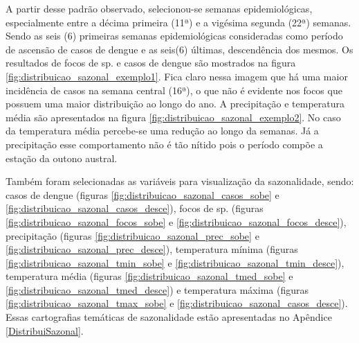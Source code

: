 \indent A partir desse padrão observado, selecionou-se semanas epidemiológicas, especialmente entre a décima primeira (11ª) e a vigésima segunda (22ª) semanas. Sendo as seis (6) primeiras semanas epidemiológicas consideradas como período de ascensão de casos de dengue e as seis(6) últimas, descendência dos mesmos. Os resultados de focos de  sp. e casos de dengue são mostrados na figura \ref{fig:distribuicao_sazonal_exemplo1}. Fica claro nessa imagem que há uma maior incidência de casos na semana central (16ª), o que não é evidente nos focos que possuem uma maior distribuição ao longo do ano. A precipitação e temperatura média são apresentados na figura \ref{fig:distribuicao_sazonal_exemplo2}. No caso da temperatura média percebe-se uma redução ao longo da semanas. Já a precipitação esse comportamento não é tão nítido pois o período compõe a estação da outono austral. 

\indent Também foram selecionadas as variáveis para visualização da sazonalidade, sendo: casos de dengue (figuras \ref{fig:distribuicao_sazonal_casos_sobe} e \ref{fig:distribuicao_sazonal_casos_desce}), focos de  sp. (figuras \ref{fig:distribuicao_sazonal_focos_sobe} e \ref{fig:distribuicao_sazonal_focos_desce}), precipitação (figuras \ref{fig:distribuicao_sazonal_prec_sobe} e \ref{fig:distribuicao_sazonal_prec_desce}), temperatura mínima (figuras \ref{fig:distribuicao_sazonal_tmin_sobe} e \ref{fig:distribuicao_sazonal_tmin_desce}), temperatura média (figuras \ref{fig:distribuicao_sazonal_tmed_sobe} e \ref{fig:distribuicao_sazonal_tmed_desce}) e temperatura máxima (figuras \ref{fig:distribuicao_sazonal_tmax_sobe} e \ref{fig:distribuicao_sazonal_casos_desce}). Essas cartografias temáticas de sazonalidade estão apresentadas no Apêndice \ref{DistribuiSazonal}. 

